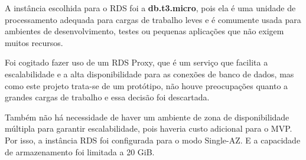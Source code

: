 


A instância escolhida para o RDS foi a \textbf{db.t3.micro}, pois ela é uma unidade de processamento adequada para cargas de trabalho leves e é comumente usada para ambientes de desenvolvimento, testes ou pequenas aplicações que não exigem muitos recursos.

Foi cogitado fazer uso de um RDS Proxy, que é um serviço que facilita a escalabilidade e a alta disponibilidade para as conexões de banco de dados, mas como este projeto trata-se de um protótipo, não houve preocupações quanto a grandes cargas de trabalho e essa decisão foi descartada. 




Também não há necessidade de haver um ambiente de zona de disponibilidade múltipla para garantir escalabilidade, pois haveria custo adicional para o MVP. Por isso, a instância RDS foi configurada para o modo Single-AZ. E a capacidade de armazenamento foi limitada a 20 GiB.




